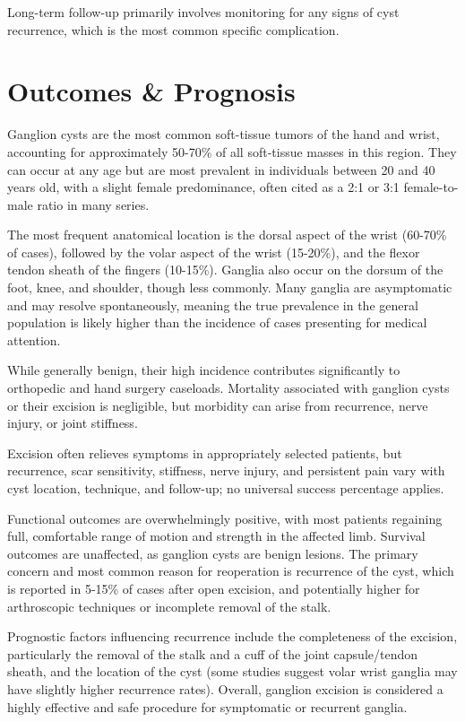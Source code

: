 Long-term follow-up primarily involves monitoring for any signs of cyst recurrence, which is the most common specific complication.

\section*{Outcomes \& Prognosis}
Ganglion cysts are the most common soft-tissue tumors of the hand and wrist, accounting for approximately 50-70\% of all soft-tissue masses in this region. They can occur at any age but are most prevalent in individuals between 20 and 40 years old, with a slight female predominance, often cited as a 2:1 or 3:1 female-to-male ratio in many series. 

The most frequent anatomical location is the dorsal aspect of the wrist (60-70\% of cases), followed by the volar aspect of the wrist (15-20\%), and the flexor tendon sheath of the fingers (10-15\%). Ganglia also occur on the dorsum of the foot, knee, and shoulder, though less commonly. Many ganglia are asymptomatic and may resolve spontaneously, meaning the true prevalence in the general population is likely higher than the incidence of cases presenting for medical attention. 

While generally benign, their high incidence contributes significantly to orthopedic and hand surgery caseloads. Mortality associated with ganglion cysts or their excision is negligible, but morbidity can arise from recurrence, nerve injury, or joint stiffness.

Excision often relieves symptoms in appropriately selected patients, but recurrence, scar sensitivity, stiffness, nerve injury, and persistent pain vary with cyst location, technique, and follow-up; no universal success percentage applies.

Functional outcomes are overwhelmingly positive, with most patients regaining full, comfortable range of motion and strength in the affected limb. Survival outcomes are unaffected, as ganglion cysts are benign lesions. The primary concern and most common reason for reoperation is recurrence of the cyst, which is reported in 5-15\% of cases after open excision, and potentially higher for arthroscopic techniques or incomplete removal of the stalk. 

Prognostic factors influencing recurrence include the completeness of the excision, particularly the removal of the stalk and a cuff of the joint capsule/tendon sheath, and the location of the cyst (some studies suggest volar wrist ganglia may have slightly higher recurrence rates). Overall, ganglion excision is considered a highly effective and safe procedure for symptomatic or recurrent ganglia.

